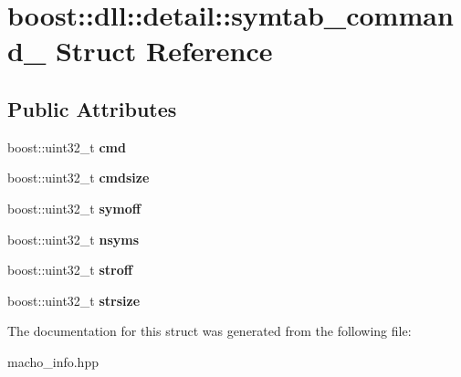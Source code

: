 \hypertarget{a00298}{}\section{boost\+:\+:dll\+:\+:detail\+:\+:symtab\+\_\+command\+\_\+ Struct Reference}
\label{a00298}
\subsection*{Public Attributes}
\begin{DoxyCompactItemize}
\item 
boost\+::uint32\+\_\+t {\bfseries cmd}\hypertarget{a00298_a875314e43c4c3e853fb966fc9a87750c}{}\label{a00298_a875314e43c4c3e853fb966fc9a87750c}

\item 
boost\+::uint32\+\_\+t {\bfseries cmdsize}\hypertarget{a00298_ad4cf9ed5b556cc0bff31f4a44553151f}{}\label{a00298_ad4cf9ed5b556cc0bff31f4a44553151f}

\item 
boost\+::uint32\+\_\+t {\bfseries symoff}\hypertarget{a00298_ad1fdad2d5447938c04767178b1495801}{}\label{a00298_ad1fdad2d5447938c04767178b1495801}

\item 
boost\+::uint32\+\_\+t {\bfseries nsyms}\hypertarget{a00298_a3b441ff3a1c1fd4c343d4a354731b89e}{}\label{a00298_a3b441ff3a1c1fd4c343d4a354731b89e}

\item 
boost\+::uint32\+\_\+t {\bfseries stroff}\hypertarget{a00298_a50e91179f578b73547c3fe13ed74b883}{}\label{a00298_a50e91179f578b73547c3fe13ed74b883}

\item 
boost\+::uint32\+\_\+t {\bfseries strsize}\hypertarget{a00298_ae5eccc05ff40a5d53e4a459d6ac38289}{}\label{a00298_ae5eccc05ff40a5d53e4a459d6ac38289}

\end{DoxyCompactItemize}


The documentation for this struct was generated from the following file\+:\begin{DoxyCompactItemize}
\item 
macho\+\_\+info.\+hpp\end{DoxyCompactItemize}
